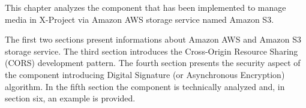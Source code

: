 This chapter analyzes the component that has been implemented to manage media in X-Project via Amazon AWS storage service named Amazon S3.

The first two sections present informations about Amazon AWS and Amazon S3 storage service. The third section introduces the Cross-Origin Resource Sharing (CORS) development pattern. The fourth section presents the security aspect of the component introducing Digital Signature (or Asynchronous Encryption) algorithm. In the fifth section the component is technically analyzed and, in section six, an example is provided.